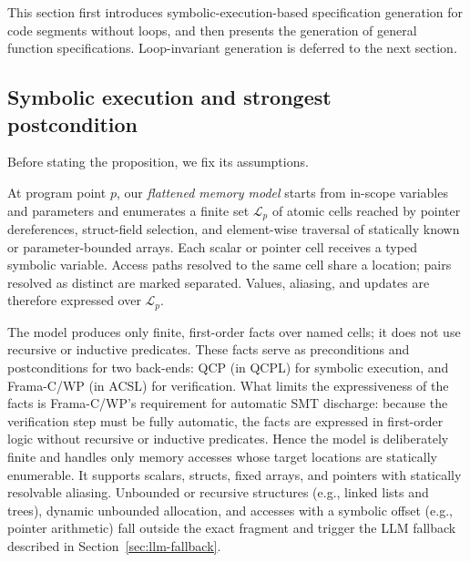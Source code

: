 This section first introduces symbolic-execution-based specification generation for code segments without loops, and then presents the generation of general function specifications. Loop-invariant generation is deferred to the next section.

\subsection{Symbolic execution and strongest postcondition} %
Before stating the proposition, we fix its assumptions. 


At program point $p$, our \emph{flattened memory model} starts from in-scope variables and parameters and enumerates a finite set $\mathcal{L}_p$ of atomic cells reached by pointer dereferences, struct-field selection, and element-wise traversal of statically known or parameter-bounded arrays. Each scalar or pointer cell receives a typed symbolic variable. Access paths resolved to the same cell share a location; pairs resolved as distinct are marked separated. Values, aliasing, and updates are therefore expressed over $\mathcal{L}_p$.

The model produces only finite, first-order facts over named cells; it does not use recursive or inductive predicates. These facts serve as preconditions and postconditions for two back-ends: QCP (in QCPL) for symbolic execution, and Frama-C/WP (in ACSL) for verification. What limits the expressiveness of the facts is Frama-C/WP's requirement for automatic SMT discharge: because the verification step must be fully automatic, the facts are expressed in first-order logic without recursive or inductive predicates. {Hence the model is deliberately finite and handles only memory accesses whose target locations are statically enumerable. It supports scalars, structs, fixed arrays, and pointers with statically resolvable aliasing. Unbounded or recursive structures (e.g., linked lists and trees), dynamic unbounded allocation, and accesses with a symbolic offset (e.g., pointer arithmetic) fall outside the exact fragment and trigger the LLM fallback described in Section~\ref{sec:llm-fallback}.}







